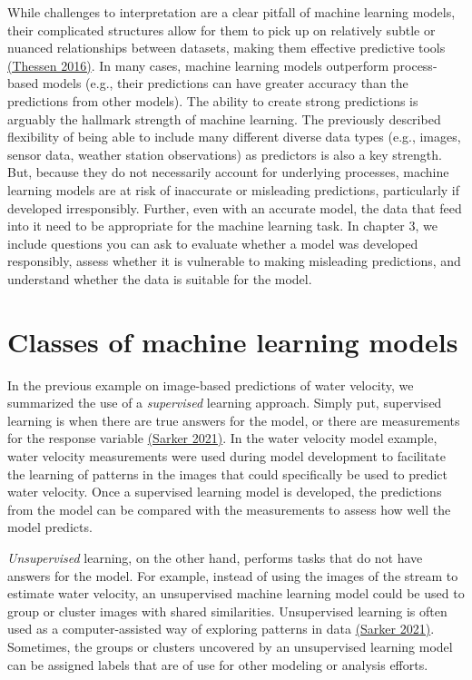 \documentclass[
]{book}
\begin{document}
While challenges to interpretation are a clear pitfall of machine learning models, their complicated structures allow for them to pick up on relatively subtle or nuanced relationships between datasets, making them effective predictive tools \href{https://doi.org/10.3897/oneeco.1.e8621}{(Thessen 2016)}. In many cases, machine learning models outperform process-based models (e.g., their predictions can have greater accuracy than the predictions from other models). The ability to create strong predictions is arguably the hallmark strength of machine learning. The previously described flexibility of being able to include many different diverse data types (e.g., images, sensor data, weather station observations) as predictors is also a key strength. But, because they do not necessarily account for underlying processes, machine learning models are at risk of inaccurate or misleading predictions, particularly if developed irresponsibly. Further, even with an accurate model, the data that feed into it need to be appropriate for the machine learning task. In chapter 3, we include questions you can ask to evaluate whether a model was developed responsibly, assess whether it is vulnerable to making misleading predictions, and understand whether the data is suitable for the model.

\hypertarget{classes-of-machine-learning-models}{%
\section{Classes of machine learning models}\label{classes-of-machine-learning-models}}

In the previous example on image-based predictions of water velocity, we summarized the use of a \emph{supervised} learning approach. Simply put, supervised learning is when there are true answers for the model, or there are measurements for the response variable \href{https://doi.org/10.1007/s42979-021-00592-x}{(Sarker 2021)}. In the water velocity model example, water velocity measurements were used during model development to facilitate the learning of patterns in the images that could specifically be used to predict water velocity. Once a supervised learning model is developed, the predictions from the model can be compared with the measurements to assess how well the model predicts.

\emph{Unsupervised} learning, on the other hand, performs tasks that do not have answers for the model. For example, instead of using the images of the stream to estimate water velocity, an unsupervised machine learning model could be used to group or cluster images with shared similarities. Unsupervised learning is often used as a computer-assisted way of exploring patterns in data \href{https://doi.org/10.1007/s42979-021-00592-x}{(Sarker 2021)}. Sometimes, the groups or clusters uncovered by an unsupervised learning model can be assigned labels that are of use for other modeling or analysis efforts.
\end{document}
